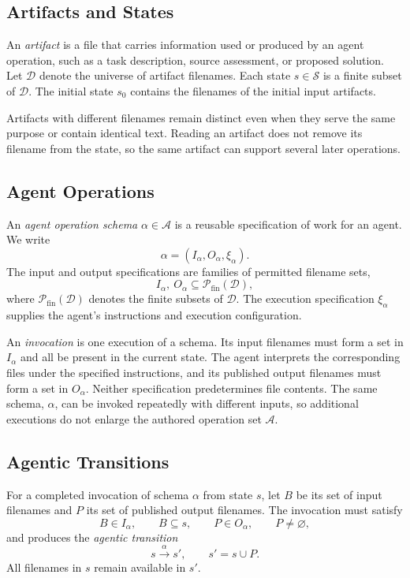 \documentclass[letterpaper]{article}
\theoremstyle{definition}
\begin{document}
\subsection{Artifacts and States}

An \emph{artifact} is a file that carries information used or produced by
an agent operation, such as a task description, source assessment, or
proposed solution. Let $\mathcal{D}$ denote the universe of artifact filenames.
Each state $s\in\mathcal{S}$ is a finite subset of $\mathcal{D}$.
The initial state $s_0$ contains the filenames of the initial input artifacts.

Artifacts with different filenames remain distinct even when they serve the
same purpose or contain identical text. Reading an artifact does not remove
its filename from the state, so the same artifact can support several later
operations.

\subsection{Agent Operations}

An \emph{agent operation schema} $\alpha\in\mathcal{A}$ is a reusable
specification of work for an agent. We write
\[
  \alpha=(I_\alpha,O_\alpha,\xi_\alpha).
\]
The input and output specifications are families of permitted filename sets,
\[
  I_\alpha,\ O_\alpha\subseteq\mathcal{P}_{\mathrm{fin}}(\mathcal{D}),
\]
where $\mathcal{P}_{\mathrm{fin}}(\mathcal{D})$ denotes the finite subsets of
$\mathcal{D}$. The execution specification $\xi_\alpha$ supplies the agent's
instructions and execution configuration.

An \emph{invocation} is one execution of a schema. Its input filenames must
form a set in $I_\alpha$ and all be present in the current state. The agent
interprets the corresponding files under the specified instructions, and
its published output filenames must form a set in $O_\alpha$. Neither
specification predetermines file contents. The same schema, $\alpha$, can be invoked
repeatedly with different inputs, so additional executions do not enlarge
the authored operation set $\mathcal{A}$.

\subsection{Agentic Transitions}

For a completed invocation of schema $\alpha$ from state $s$, let $B$ be
its set of input filenames and $P$ its set of published output filenames.
The invocation must satisfy
\[
  B\in I_\alpha,\qquad B\subseteq s,\qquad P\in O_\alpha,\qquad P\ne\varnothing,
\]
and produces the \emph{agentic transition}
\[
  s\xrightarrow{\alpha}s',\qquad s'=s\cup P.
\]
All filenames in $s$ remain available in $s'$.
\end{document}

